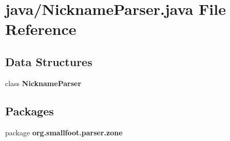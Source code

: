 \section{java/\+Nickname\+Parser.java File Reference}
\label{NicknameParser_8java}
\subsection*{Data Structures}
\begin{DoxyCompactItemize}
\item 
class {\bf Nickname\+Parser}
\end{DoxyCompactItemize}
\subsection*{Packages}
\begin{DoxyCompactItemize}
\item 
package {\bf org.\+smallfoot.\+parser.\+zone}
\end{DoxyCompactItemize}
